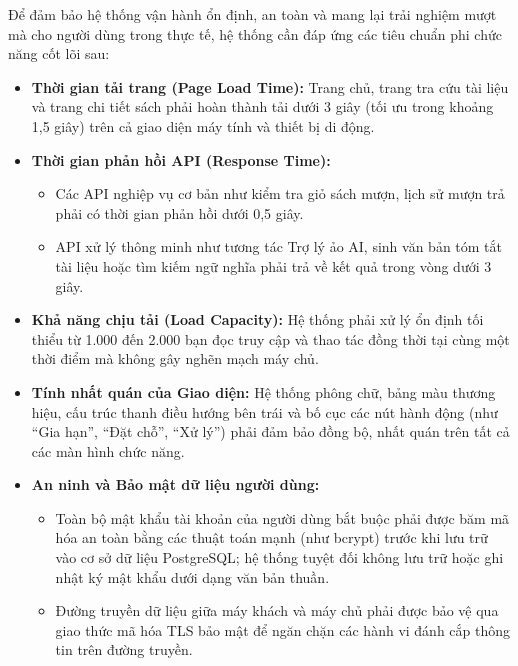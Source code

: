 Để đảm bảo hệ thống vận hành ổn định, an toàn và mang lại trải nghiệm mượt mà cho người dùng trong thực tế, hệ thống cần đáp ứng các tiêu chuẩn phi chức năng cốt lõi sau:

\begin{itemize}
    \item \textbf{Thời gian tải trang (Page Load Time):} Trang chủ, trang tra cứu tài liệu và trang chi tiết sách phải hoàn thành tải dưới 3 giây (tối ưu trong khoảng 1,5 giây) trên cả giao diện máy tính và thiết bị di động.
    
    \item \textbf{Thời gian phản hồi API (Response Time):} 
    \begin{itemize}
        \item Các API nghiệp vụ cơ bản như kiểm tra giỏ sách mượn, lịch sử mượn trả phải có thời gian phản hồi dưới 0,5 giây.
        \item API xử lý thông minh như tương tác Trợ lý ảo AI, sinh văn bản tóm tắt tài liệu hoặc tìm kiếm ngữ nghĩa phải trả về kết quả trong vòng dưới 3 giây.
    \end{itemize}
    
    \item \textbf{Khả năng chịu tải (Load Capacity):} Hệ thống phải xử lý ổn định tối thiểu từ 1.000 đến 2.000 bạn đọc truy cập và thao tác đồng thời tại cùng một thời điểm mà không gây nghẽn mạch máy chủ.
    
    \item \textbf{Tính nhất quán của Giao diện:} Hệ thống phông chữ, bảng màu thương hiệu, cấu trúc thanh điều hướng bên trái và bố cục các nút hành động (như ``Gia hạn'', ``Đặt chỗ'', ``Xử lý'') phải đảm bảo đồng bộ, nhất quán trên tất cả các màn hình chức năng.
    
    \item \textbf{An ninh và Bảo mật dữ liệu người dùng:} 
    \begin{itemize}
        \item Toàn bộ mật khẩu tài khoản của người dùng bắt buộc phải được băm mã hóa an toàn bằng các thuật toán mạnh (như bcrypt) trước khi lưu trữ vào cơ sở dữ liệu PostgreSQL; hệ thống tuyệt đối không lưu trữ hoặc ghi nhật ký mật khẩu dưới dạng văn bản thuần.
        \item Đường truyền dữ liệu giữa máy khách và máy chủ phải được bảo vệ qua giao thức mã hóa TLS bảo mật để ngăn chặn các hành vi đánh cắp thông tin trên đường truyền.
    \end{itemize}
    

\end{itemize}

